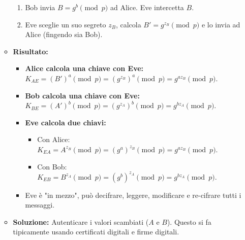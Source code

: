 \documentclass{article}
\begin{document}
\begin{itemize}
\begin{itemize}
\begin{enumerate}
                    \item Bob invia $B = g^b \pmod{p}$ ad Alice. Eve intercetta $B$.
                    \item Eve sceglie un suo segreto $z_B$, calcola $B' = g^{z_B} \pmod{p}$ e lo invia ad Alice (fingendo sia Bob).
                \end{enumerate}
            \item \textbf{Risultato:}
                \begin{itemize}
                    \item \textbf{Alice calcola una chiave con Eve:} $K_{AE} = (B')^a \pmod{p} = (g^{z_B})^a \pmod{p} = g^{az_B} \pmod{p}$.
                    \item \textbf{Bob calcola una chiave con Eve:} $K_{BE} = (A')^b \pmod{p} = (g^{z_A})^b \pmod{p} = g^{bz_A} \pmod{p}$.
                    \item \textbf{Eve calcola due chiavi:}
                        \begin{itemize}
                            \item Con Alice: $K_{EA} = A^{z_B} \pmod{p} = (g^a)^{z_B} \pmod{p} = g^{az_B} \pmod{p}$.
                            \item Con Bob: $K_{EB} = B^{z_A} \pmod{p} = (g^b)^{z_A} \pmod{p} = g^{bz_A} \pmod{p}$.
                        \end{itemize}
                    \item Eve è "in mezzo", può decifrare, leggere, modificare e re-cifrare tutti i messaggi.
                \end{itemize}
            \item \textbf{Soluzione:} Autenticare i valori scambiati ($A$ e $B$). Questo si fa tipicamente usando certificati digitali e firme digitali.
        \end{itemize}
        \begin{figure}[H]
            \centering
\end{figure}
\end{itemize}
\end{document}
